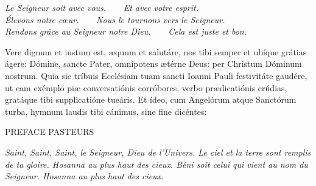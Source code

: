 \documentclass[twoside]{article}
\begin{document}

\emph{\vv Le Seigneur soit avec vous.~~~~\rr Et avec votre esprit.\\
\vv Élevons notre cœur.~~~~\rr Nous le tournons vers le Seigneur.\\
\vv Rendons grâce au Seigneur notre Dieu.~~~~\rr Cela est juste et bon.}

\begin{paracol}{2}
\switchcolumn
\switchcolumn*

Vere dignum et iustum est, æquum et salutáre,
nos tibi semper et ubíque grátias ágere:
Dómine, sancte Pater, omnípotens ætérne Deus:
per Christum Dóminum nostrum.
Quia sic tríbuis Ecclésiam tuam sancti Ioanni Pauli festivitáte gaudére,
ut eam exémplo piæ conversatiónis corróbores,
verbo prædicatiónis erúdias,
gratáque tibi supplicatióne tueáris.
Et ídeo, cum Angelórum atque Sanctórum turba,
hymnum laudis tibi cánimus, sine fine dicéntes: 

\switchcolumn

PREFACE PASTEURS

\end{paracol}

\newpage

\emph{Saint, Saint, Saint, le Seigneur, Dieu de l'Univers. Le ciel et la terre sont remplis de ta gloire. Hosanna au plus haut des cieux. Béni soit celui qui vient au nom du Seigneur. Hosanna au plus haut des cieux.}
\end{document}
